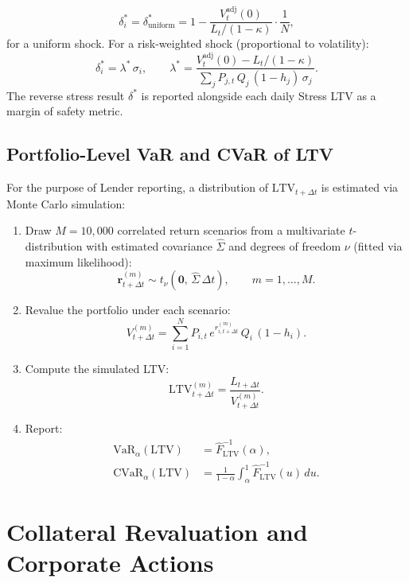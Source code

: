 \documentclass[12pt, a4paper]{article}
\newcommand{\LTV}{\mathrm{LTV}}
\newcommand{\1}{\mathbbm{1}}
\newcommand{\VaR}{\mathrm{VaR}}
\newcommand{\CVaR}{\mathrm{CVaR}}
\begin{document}
\begin{equation}
    \delta_i^* = \delta^*_{\mathrm{uniform}}
    = 1 - \frac{V_t^{\mathrm{adj}}(0)}{L_t / (1-\kappa)}
    \cdot \frac{1}{N},
    \label{eq:reverse_uniform}
\end{equation}
for a uniform shock. For a risk-weighted shock (proportional to volatility):
\[
\delta_i^* = \lambda^*\,\sigma_i,
\qquad
\lambda^* = \frac{V_t^{\mathrm{adj}}(0) - L_t/(1-\kappa)}
                 {\sum_j P_{j,t}\,Q_j\,(1-h_j)\,\sigma_j}.
\]
The reverse stress result $\delta^*$ is reported alongside each daily
Stress LTV as a margin of safety metric.

\subsection{Portfolio-Level VaR and CVaR of LTV}

For the purpose of Lender reporting, a distribution of $\LTV_{t+\Delta t}$ is
estimated via Monte Carlo simulation:

\begin{enumerate}[leftmargin=1.5em]
    \item Draw $M = 10{,}000$ correlated return scenarios from a multivariate
    $t$-distribution with estimated covariance $\hat{\Sigma}$ and degrees of
    freedom $\nu$ (fitted via maximum likelihood):
    \[
    \mathbf{r}_{t+\Delta t}^{(m)} \sim t_\nu(\mathbf{0},\,\hat{\Sigma}\,\Delta t),
    \qquad m = 1,\ldots,M.
    \]
    \item Revalue the portfolio under each scenario:
    \[
    V_{t+\Delta t}^{(m)}
    = \sum_{i=1}^{N} P_{i,t}\,e^{r_{i,t+\Delta t}^{(m)}}\,Q_i\,(1-h_i).
    \]
    \item Compute the simulated LTV:
    \[
    \LTV_{t+\Delta t}^{(m)} = \frac{L_{t+\Delta t}}{V_{t+\Delta t}^{(m)}}.
    \]
    \item Report:
    \begin{align*}
    \VaR_{\alpha}(\LTV) &= \hat{F}_{\LTV}^{-1}(\alpha),\\
    \CVaR_{\alpha}(\LTV) &= \frac{1}{1-\alpha}\int_\alpha^1 \hat{F}_{\LTV}^{-1}(u)\,du.
    \end{align*}
\end{enumerate}

\section{Collateral Revaluation and Corporate Actions}
\label{sec:corp_actions}
\end{document}
